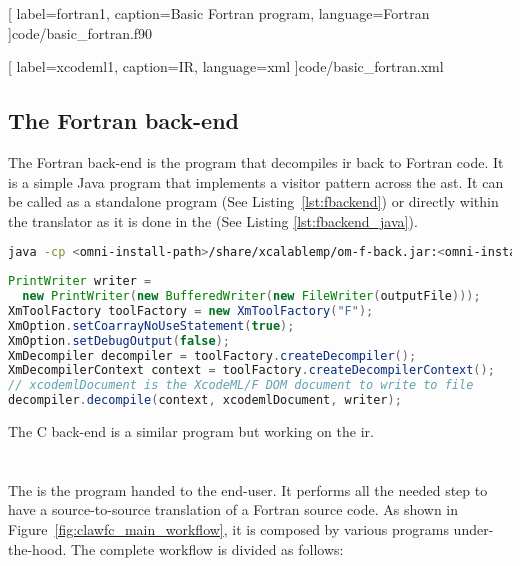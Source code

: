 
  [
    label=fortran1,
    caption=Basic Fortran program,
    language=Fortran
  ]{code/basic_fortran.f90}


  [
    label=xcodeml1,
    caption=\xcodemlf IR,
    language=xml
  ]{code/basic_fortran.xml}

\subsection{The Fortran back-end}
The Fortran back-end is the program that decompiles \gls{ir} back to Fortran
code. It is a simple Java program that implements a visitor pattern across
the \gls{ast}. It can be called as a standalone program
(See Listing~\ref{lst:fbackend}) or directly within the translator as it is
done in the \clawfcomp (See Listing \ref{lst:fbackend_java}).

\begin{lstlisting}[label=lst:fbackend, language=Bash, caption=Execute the
  Fortran back-end as a standalone]
java -cp <omni-install-path>/share/xcalablemp/om-f-back.jar:<omni-install-path>/share/xcalablemp/om-exc-tools.jar xcodeml.f.util.omx2f -l xcodeml.xml
\end{lstlisting}

\begin{lstlisting}[label=lst:fbackend_java, language=Java,
  caption=Fortran back-end called from Java]
PrintWriter writer =
  new PrintWriter(new BufferedWriter(new FileWriter(outputFile)));
XmToolFactory toolFactory = new XmToolFactory("F");
XmOption.setCoarrayNoUseStatement(true);
XmOption.setDebugOutput(false);
XmDecompiler decompiler = toolFactory.createDecompiler();
XmDecompilerContext context = toolFactory.createDecompilerContext();
// xcodemlDocument is the XcodeML/F DOM document to write to file
decompiler.decompile(context, xcodemlDocument, writer);
\end{lstlisting}

The C back-end is a similar program but working on the \xcodemlc{} \gls{ir}.

\section{\clawfcomp}
The \clawfc is the program handed to the end-user. It performs all the needed
step to have a source-to-source translation of a Fortran source code.
As shown in Figure~\ref{fig:clawfc_main_workflow},
it is composed by various programs under-the-hood.
The complete workflow is divided as follows:

